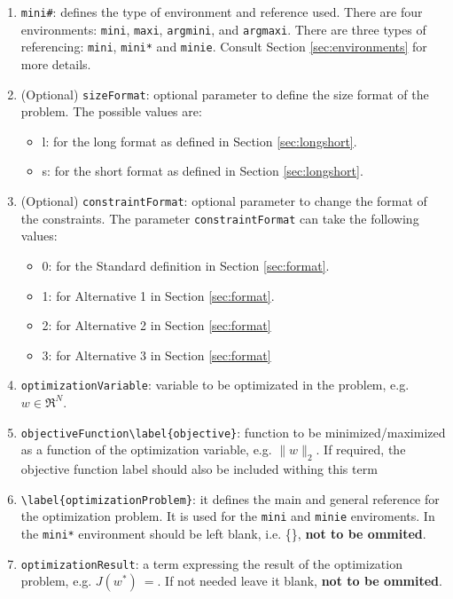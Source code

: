 \documentclass[a4paper]{article}
\begin{document}
\begin{enumerate}[label=(\roman*)]
	\item \verb|mini#|: defines the type of environment and reference used. There are four environments: \verb|mini|, \verb|maxi|, \verb|argmini|, and \verb|argmaxi|. There are three types of referencing: \verb|mini|, \verb|mini*| and \verb|minie|. Consult Section \ref{sec:environments} for more details. 
	\item (Optional) \verb|sizeFormat|: optional parameter to define the size format of the problem. The possible values are:
	\begin{itemize}
		\item l: for the long format as defined in Section \ref{sec:longshort}.
		\item s: for the short format as defined in Section \ref{sec:longshort}.
	\end{itemize}	
	\item (Optional) \verb|constraintFormat|: optional parameter to change the format of the constraints. The parameter \verb|constraintFormat| can take the following values: 
	\begin{itemize}
	\item 0: for the Standard definition in Section \ref{sec:format}.
	\item 1: for Alternative 1 in Section \ref{sec:format}.
	\item 2: for Alternative 2 in Section \ref{sec:format}
	\item 3: for Alternative 3 in Section \ref{sec:format}		
	\end{itemize}
	\item \verb|optimizationVariable|: variable to be optimizated in the problem, e.g. $w \in \Re^N$.
	\item \verb|objectiveFunction\label{objective}|: function to be minimized/maximized as a function of the optimization variable, e.g. $\|w\|_2$. If required, the objective function label should also be included withing this term
	\item \verb|\label{optimizationProblem}|: it defines the main and general reference for the optimization problem. It is used for the \verb|mini| and \verb|minie| enviroments. In the \verb|mini*| environment should be left blank, i.e. \{\}, \textbf{not to be ommited}.
	\item \verb|optimizationResult|: a term expressing the result of the optimization problem, e.g. $J(w^*)~=$. If not needed leave it blank, \textbf{not to be ommited}.
\end{enumerate}
\end{document}
